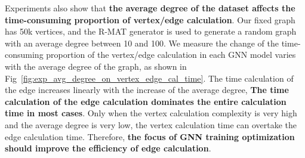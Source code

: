 Experiments also show that \textbf{the average degree of the dataset affects the time-consuming proportion of vertex/edge calculation}. 
Our fixed graph has 50k vertices, and the R-MAT generator is used to generate a random graph with an average degree between 10 and 100.
We measure the change of the time-consuming proportion of the vertex/edge calculation in each GNN model varies with the average degree of the graph,
as shown in Fig~\ref{fig:exp_avg_degree_on_vertex_edge_cal_time}. The time calculation of the edge increases linearly with the increase of the average degree,
\textbf{The time calculation of the edge calculation dominates the entire calculation time in most cases}. 
Only when the vertex calculation complexity is very high and the average degree is very low, the vertex calculation time can overtake the edge calculation time.
Therefore, \textbf{the focus of GNN training optimization should improve the efficiency of edge calculation}.

